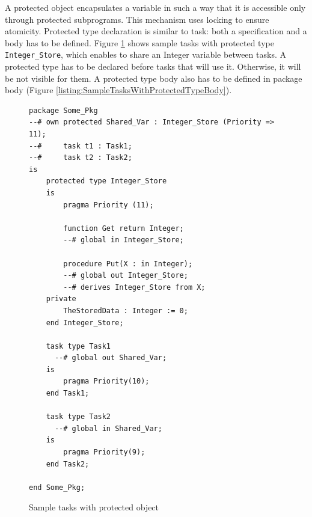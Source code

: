 A protected object encapsulates a variable in such a way that it is accessible only through protected subprograms. This mechanism uses locking to ensure atomicity. Protected type declaration is similar to task: both a specification and a body has to be defined. Figure \ref{listing:SampleTasksWithProtectedType} shows sample tasks with protected type \lstinline{Integer_Store}, which enables to share an Integer variable between tasks. A protected type has to be declared before tasks that will use it. Otherwise, it will be not visible for them. A protected type body also has to be defined in package body (Figure \ref{listing:SampleTasksWithProtectedTypeBody}).

\begin{figure}[ht]
\singlespacing
\begin{lstlisting}[frame=single, gobble=0]
package Some_Pkg
--# own protected Shared_Var : Integer_Store (Priority => 11);
--#     task t1 : Task1;
--#     task t2 : Task2;
is
    protected type Integer_Store
    is
        pragma Priority (11);

        function Get return Integer;
        --# global in Integer_Store;

        procedure Put(X : in Integer);
        --# global out Integer_Store;
        --# derives Integer_Store from X;
    private
        TheStoredData : Integer := 0;
    end Integer_Store;

    task type Task1
      --# global out Shared_Var;
    is
        pragma Priority(10);
    end Task1;

    task type Task2
      --# global in Shared_Var;
    is
        pragma Priority(9);
    end Task2;

end Some_Pkg;
\end{lstlisting}
\doublespacing
\caption{Sample tasks with protected object}
\label{listing:SampleTasksWithProtectedType}
\end{figure}


